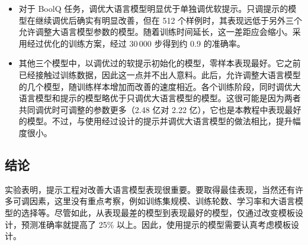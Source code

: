 \begin{itemize}
\item 对于 BoolQ 任务，调优大语言模型明显优于单独调优软提示。只调提示的模型在继续调优后确实有明显改善，但在 512 个样例时，其表现远低于另外三个允许调整大语言模型参数的模型。随着训练时间延长，这一差距应会缩小。采用经过优化的训练方案，经过 30\,000 步得到约 0.9 的准确率。
\item 其他三个模型中，以调优过的软提示初始化的模型，零样本表现最好。它之前已经接触过训练数据，因此这一点并不出人意料。此后，允许调整大语言模型的几个模型，随训练样本增加而改善的速度相近。各个训练阶段，同时调优大语言模型和提示的模型略优于只调优大语言模型的模型。这很可能是因为两者共同调优时可调整的参数更多（2.48 亿对 2.22 亿），它也是本教程中表现最好的模型。不过，与使用经过设计的提示并调优大语言模型的做法相比，提升幅度很小。
\end{itemize}


\subsection{结论}
实验表明，提示工程对改善大语言模型表现很重要。要取得最佳表现，当然还有许多可调因素，这里没有重点考察，例如训练集规模、训练轮数、学习率和大语言模型的选择等。尽管如此，从表现最差的模型到表现最好的模型，仅通过改变模板设计，预测准确率就提高了 25\% 以上。因此，使用提示的模型需要认真考虑模板设计。
